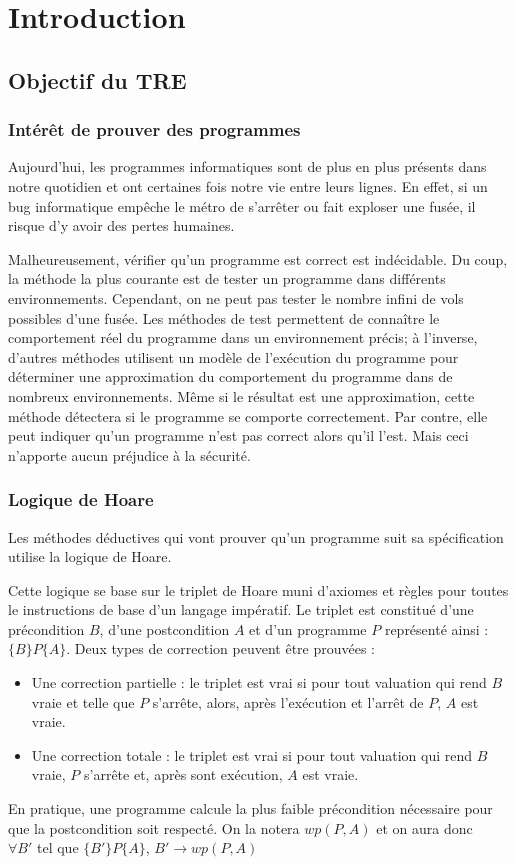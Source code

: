 \documentclass[9pt]{book}
\begin{document}
\chapter{Introduction}
	\section{Objectif du TRE}
		\subsection{Int\'er\^et de prouver des programmes}
		Aujourd'hui, les programmes informatiques sont de plus en plus pr\'esents dans notre quotidien et ont certaines fois notre vie entre leurs lignes. En effet, si un bug informatique emp\^eche le m\'etro de s'arr\^eter ou fait exploser une fus\'ee, il risque d'y avoir des pertes humaines. \par
		Malheureusement, v\'erifier qu'un programme est correct est ind\'ecidable. Du coup, la m\'ethode la plus courante est de tester un programme dans diff\'erents environnements. Cependant, on ne peut pas tester le nombre infini de vols possibles d'une fus\'ee. Les m\'ethodes de test permettent de conna\^itre le comportement r\'eel du programme dans un environnement pr\'ecis; \`a l'inverse, d'autres m\'ethodes utilisent un mod\`ele de l'ex\'ecution du programme pour d\'eterminer une approximation du comportement du programme dans de nombreux environnements. M\^eme si le r\'esultat est une approximation, cette m\'ethode d\'etectera si le programme se comporte correctement. Par contre, elle peut indiquer qu'un programme n'est pas correct alors qu'il l'est. Mais ceci n'apporte aucun pr\'ejudice \`a la s\'ecurit\'e.
			
		\subsection{Logique de Hoare}
		Les m\'ethodes d\'eductives qui vont prouver qu'un programme suit sa sp\'ecification utilise la logique de Hoare.\par 
		Cette logique se base sur le triplet de Hoare muni d'axiomes et r\`egles pour toutes le instructions de base d'un langage imp\'eratif. Le triplet est constitu\'e d'une pr\'econdition $B$, d'une postcondition $A$ et d'un programme $P$ repr\'esent\'e ainsi : $\{B\}P\{A\}$. Deux types de correction peuvent \^etre prouv\'ees :
		\begin{itemize}
			\item Une correction partielle : le triplet est vrai si pour tout valuation qui rend $B$ vraie et telle que $P$ s'arr\^ete, alors, apr\`es l'ex\'ecution et l'arr\^et de $P$, $A$ est vraie.
			\item Une correction totale : le triplet est vrai si pour tout valuation qui rend $B$ vraie, $P$ s'arr\^ete et, apr\`es sont ex\'ecution, $A$ est vraie.
		\end{itemize}
		En pratique, une programme calcule la plus faible pr\'econdition n\'ecessaire pour que la postcondition soit respect\'e. On la notera $wp(P,A)$ et on aura donc\\ $\forall B'$ tel que $\{B'\}P\{A\}$, $B' \rightarrow wp(P,A)$
\end{document}
